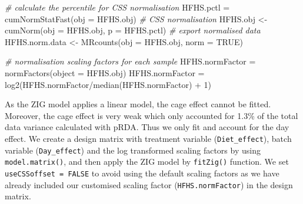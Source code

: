 \documentclass[
]{book}
\newenvironment{Shaded}{\begin{snugshade}}{\end{snugshade}}
\newcommand{\AttributeTok}[1]{\textcolor[rgb]{0.77,0.63,0.00}{#1}}
\newcommand{\CommentTok}[1]{\textcolor[rgb]{0.56,0.35,0.01}{\textit{#1}}}
\newcommand{\ConstantTok}[1]{\textcolor[rgb]{0.00,0.00,0.00}{#1}}
\newcommand{\DecValTok}[1]{\textcolor[rgb]{0.00,0.00,0.81}{#1}}
\newcommand{\FunctionTok}[1]{\textcolor[rgb]{0.00,0.00,0.00}{#1}}
\newcommand{\NormalTok}[1]{#1}
\newcommand{\OtherTok}[1]{\textcolor[rgb]{0.56,0.35,0.01}{#1}}
\newcommand{\SpecialCharTok}[1]{\textcolor[rgb]{0.00,0.00,0.00}{#1}}
\begin{document}
\begin{Shaded}
\begin{Highlighting}[]
\CommentTok{\# calculate the percentile for CSS normalisation}
\NormalTok{HFHS.pctl }\OtherTok{=} \FunctionTok{cumNormStatFast}\NormalTok{(}\AttributeTok{obj =}\NormalTok{ HFHS.obj)}
\CommentTok{\# CSS normalisation}
\NormalTok{HFHS.obj }\OtherTok{\textless{}{-}} \FunctionTok{cumNorm}\NormalTok{(}\AttributeTok{obj =}\NormalTok{ HFHS.obj, }\AttributeTok{p =}\NormalTok{ HFHS.pctl)}
\CommentTok{\# export normalised data}
\NormalTok{HFHS.norm.data }\OtherTok{\textless{}{-}} \FunctionTok{MRcounts}\NormalTok{(}\AttributeTok{obj =}\NormalTok{ HFHS.obj, }\AttributeTok{norm =} \ConstantTok{TRUE}\NormalTok{)}

\CommentTok{\# normalisation scaling factors for each sample }
\NormalTok{HFHS.normFactor }\OtherTok{=} \FunctionTok{normFactors}\NormalTok{(}\AttributeTok{object =}\NormalTok{ HFHS.obj)}
\NormalTok{HFHS.normFactor }\OtherTok{=} \FunctionTok{log2}\NormalTok{(HFHS.normFactor}\SpecialCharTok{/}\FunctionTok{median}\NormalTok{(HFHS.normFactor) }\SpecialCharTok{+} \DecValTok{1}\NormalTok{)}
\end{Highlighting}
\end{Shaded}

As the ZIG model applies a linear model, the cage effect cannot be fitted. Moreover, the cage effect is very weak which only accounted for 1.3\% of the total data variance calculated with pRDA. Thus we only fit and account for the day effect. We create a design matrix with treatment variable (\texttt{Diet\_effect}), batch variable (\texttt{Day\_effect}) and the log transformed scaling factors by using \texttt{model.matrix()}, and then apply the ZIG model by \texttt{fitZig()} function. We set \texttt{useCSSoffset\ =\ FALSE} to avoid using the default scaling factors as we have already included our customised scaling factor (\texttt{HFHS.normFactor}) in the design matrix.
\end{document}
